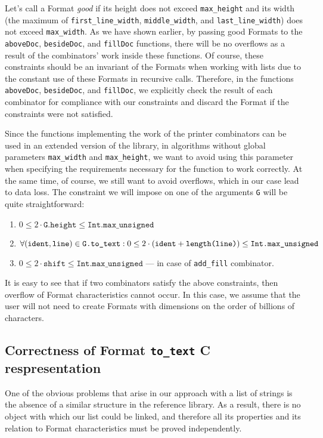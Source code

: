\documentclass[14pt]{constructor-diploma}
\begin{document}
Let's call a Format \textit{good} if its height does not exceed \texttt{max\_height} and its width (the maximum of \texttt{first\_line\_width}, \texttt{middle\_width}, and \texttt{last\_}\texttt{line\_}\newline\texttt{width}) does not exceed \texttt{max\_width}. 
As we have shown earlier, by passing good Formats to the \texttt{aboveDoc}, \texttt{besideDoc}, and \texttt{fillDoc} functions, there will be no overflows as a result of the combinators' work inside these functions.
Of course, these constraints should be an invariant of the Formats when working with lists due to the constant use of these Formats in recursive calls. 
Therefore, in the functions \texttt{aboveDoc}, \texttt{besideDoc}, and \texttt{fillDoc}, we explicitly check the result of each combinator for compliance with our constraints and discard the Format if the constraints were not satisfied.

Since the functions implementing the work of the printer combinators can be used in an extended version of the library, 
in algorithms without global parameters \texttt{max\_width} and \texttt{max\_height}, we want to avoid using this parameter when specifying the requirements necessary for the function to work correctly. 
At the same time, of course, we still want to avoid overflows, which in our case lead to data loss. The constraint we will impose on one of the arguments \texttt{G} will be quite straightforward:
\begin{enumerate}
  \item $0 \le 2 \cdot \texttt{G.height} \le \texttt{Int.max\_unsigned}$
  \item $\forall (\texttt{ident}, \texttt{line}) \in \texttt{G.to\_text}:\\ 0 \le 2 \cdot (\texttt{ident} + \texttt{length(line)}) \le \texttt{Int.max\_unsigned}$
  \item $0 \le 2 \cdot \texttt{shift} \le \texttt{Int.max\_unsigned}$ --- in case of \texttt{add\_fill} combinator.
\end{enumerate}

It is easy to see that if two combinators satisfy the above constraints, then overflow of Format characteristics cannot occur.
In this case, we assume that the user will not need to create Formats with dimensions on the order of billions of characters.

\subsection{Correctness of Format \texttt{to\_text} C respresentation}
One of the obvious problems that arise in our approach with a list of strings is the absence of a similar structure in the reference library. 
As a result, there is no object with which our list could be linked, and therefore all its properties and its relation to Format characteristics must be proved independently.
\end{document}
